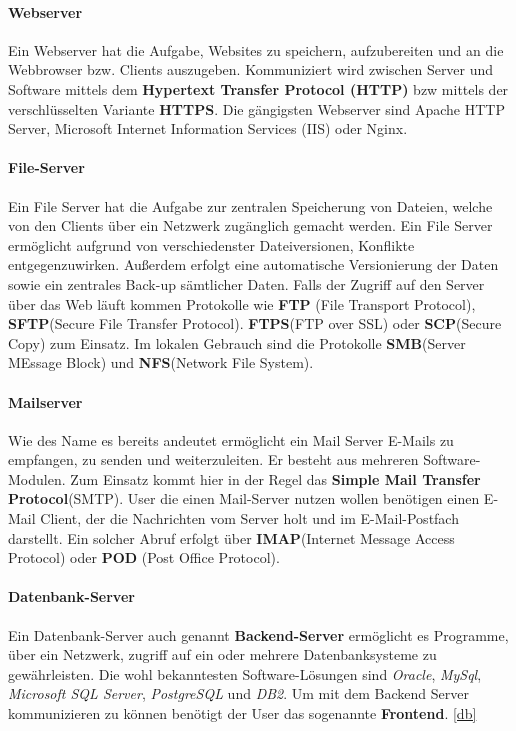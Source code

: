 \paragraph*{Webserver}
Ein Webserver hat die Aufgabe, Websites zu speichern, aufzubereiten und an die Webbrowser bzw. Clients
auszugeben. Kommuniziert wird zwischen Server und Software mittels dem \textbf{Hypertext Transfer Protocol
    (HTTP)} bzw mittels der verschlüsselten Variante \textbf{HTTPS}. Die gängigsten Webserver sind
Apache HTTP Server, Microsoft Internet Information Services (IIS) oder Nginx.

\paragraph{File-Server}
Ein File Server hat die Aufgabe zur zentralen Speicherung von Dateien, welche von den Clients
über ein Netzwerk zugänglich gemacht werden. Ein File Server ermöglicht aufgrund von verschiedenster
Dateiversionen, Konflikte entgegenzuwirken. Außerdem erfolgt eine automatische Versionierung der
Daten sowie ein zentrales Back-up sämtlicher Daten. Falls der Zugriff auf den Server über das
Web läuft kommen Protokolle wie \textbf{FTP} (File Transport Protocol), \textbf{SFTP}(Secure File Transfer
Protocol). \textbf{FTPS}(FTP over SSL) oder \textbf{SCP}(Secure Copy) zum Einsatz. Im lokalen
Gebrauch sind die Protokolle \textbf{SMB}(Server MEssage Block) und \textbf{NFS}(Network File System).

\paragraph{Mailserver}
Wie des Name es bereits andeutet ermöglicht ein Mail Server E-Mails zu empfangen, zu senden und
weiterzuleiten. Er besteht aus mehreren Software-Modulen. Zum Einsatz kommt hier in der Regel
das \textbf{Simple Mail Transfer Protocol}(SMTP). User die einen Mail-Server nutzen
wollen benötigen einen E-Mail Client, der die Nachrichten vom Server holt und im E-Mail-Postfach
darstellt. Ein solcher Abruf erfolgt über \textbf{IMAP}(Internet Message Access Protocol) oder
\textbf{POD} (Post Office Protocol).

\paragraph{Datenbank-Server}
Ein Datenbank-Server auch genannt \textbf{Backend-Server} ermöglicht es Programme, über ein Netzwerk,
zugriff auf ein oder mehrere
Datenbanksysteme zu gewährleisten. Die wohl bekanntesten Software-Lösungen sind \textit{Oracle},
\textit{MySql}, \textit{Microsoft SQL Server}, \textit{PostgreSQL} und \textit{DB2}. Um mit dem
Backend Server kommunizieren zu können benötigt der User das sogenannte \textbf{Frontend}.
\ref{db}

